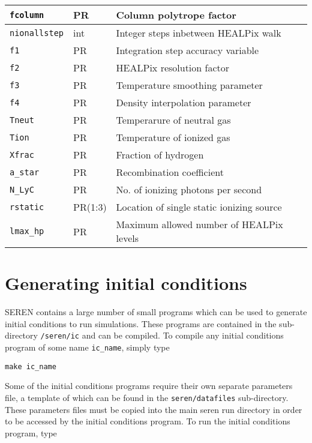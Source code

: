 \documentclass[a4paper]{article}
\newcommand{\NAME}{SEREN }
\newcommand{\name}{seren}
\newcommand{\var}[1]{\texttt{#1}}
\begin{document}
\begin{center}
\begin{supertabular}{|p{3cm}|p{2cm}|p{8cm}|}
\var{fcolumn}    & PR & Column polytrope factor \\ \hline
\var{nionallstep}& int & Integer steps inbetween HEALPix walk \\
\var{f1}         & PR  & Integration step accuracy variable \\
\var{f2}         & PR  & HEALPix resolution factor \\
\var{f3}         & PR  & Temperature smoothing parameter \\
\var{f4}         & PR  & Density interpolation parameter \\
\var{Tneut}      & PR  & Temperarure of neutral gas \\
\var{Tion}       & PR  & Temperature of ionized gas \\
\var{Xfrac}      & PR  & Fraction of hydrogen \\
\var{a\_star}    & PR  & Recombination coefficient \\
\var{N\_LyC}     & PR  & No. of ionizing photons per second \\
\var{rstatic}    & PR(1:3) & Location of single static ionizing source \\
\var{lmax\_hp}   & PR  & Maximum allowed number of HEALPix levels \\
\end{supertabular}
\end{center}
\vspace{1cm}


\newpage



\section{Generating initial conditions} \label{SS:ICS}
\NAME contains a large number of small programs which can be used to generate initial conditions to run simulations.  These programs are contained in the sub-directory \var{/\name/ic} and can be compiled.  To compile any initial conditions program of some name \var{ic\_name}, simply type \newline 

\var{make ic\_name} \newline

\noindent Some of the initial conditions programs require their own separate parameters file, a template of which can be found in the \var{\name/datafiles} sub-directory.  These parameters files must be copied into the main seren run directory in order to be accessed by the initial conditions program.  To run the initial conditions program, type \newline
\end{document}
